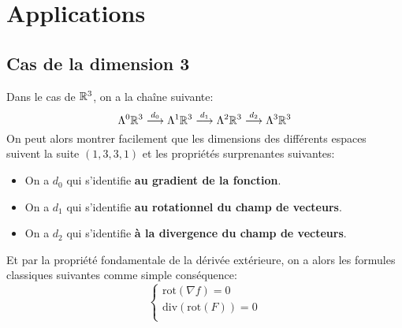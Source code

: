 \chapter{Applications}
   \section{Cas de la dimension 3}
   Dans le cas de \(\mathbb{R}^3\), on a la chaîne suivante:
   \[
      \Lambda^0 \mathbb{R}^3 \overset{d_0}{\longrightarrow} \Lambda^1 \mathbb{R}^3 \overset{d_1}{\longrightarrow} \Lambda^2 \mathbb{R}^3 \overset{d_2}{\longrightarrow} \Lambda^3 \mathbb{R}^3
   \]
   On peut alors montrer facilement que les dimensions des différents espaces suivent la suite \((1, 3, 3, 1)\) et les propriétés surprenantes suivantes:
   \begin{itemize}
      \item On a \(d_0\) qui s'identifie \textbf{au gradient de la fonction}.
      \item On a \(d_1\) qui s'identifie \textbf{au rotationnel du champ de vecteurs}.
      \item On a \(d_2\) qui s'identifie \textbf{à la divergence du champ de vecteurs}.
   \end{itemize}
   Et par la propriété fondamentale de la dérivée extérieure, on a alors les formules classiques suivantes comme simple conséquence:
   \[
      \begin{cases}
         \text{rot}(\nabla f) = 0\\
         \text{div}(\text{rot}(F)) = 0\\
      \end{cases}
   \]

